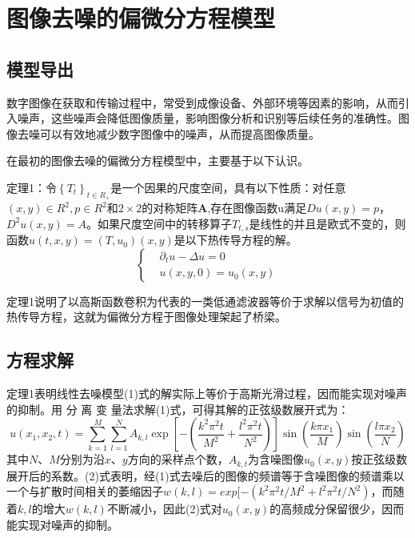 \titleformat{\chapter}[hang]{\linespread{1}\heiti\sanhao\bfseries\filright}{\thechapter}{1em}{}{}
\chapter{图像去噪的偏微分方程模型}
\section{模型导出}
数字图像在获取和传输过程中，常受到成像设备、外部环境等因素的影响，从而引入噪声，这些噪声会降低图像质量，影响图像分析和识别等后续任务的准确性。图像去噪可以有效地减少数字图像中的噪声，从而提高图像质量。

在最初的图像去噪的偏微分方程模型中，主要基于以下认识。

定理1：令$\left\{T_t\right\}_{t\in R_+}$是一个因果的尺度空间，具有以下性质：对任意$(x,y)\in R^2,p \in R^2$和$2\times 2$的对称矩阵\textbf{A},存在图像函数u满足$Du(x,y)=p$，$D^2 u(x,y)=A$。如果尺度空间中的转移算子$T_{t,s}$是线性的并且是欧式不变的，则函数$u(t,x,y)=(T,u_0)(x,y)$是以下热传导方程的解。\cite{aubert2006mathematical}
\begin{equation}
\left\{
\begin{aligned}
& \partial_tu-\Delta u=0 \\
& u(x,y,0)=u_0(x,y)
\end{aligned}
\right.
\tag{1}
\end{equation}

定理1说明了以高斯函数卷积为代表的一类低通滤波器等价于求解以信号为初值的热传导方程，这就为偏微分方程于图像处理架起了桥梁。\cite{JGDJ200508009}

\section{方程求解}
定理1表明线性去噪模型(1)式的解实际上等价于高斯光滑过程，因而能实现对噪声的抑制。用 分 离 变 量法求解(1)式，可得其解的正弦级数展开式为：
\begin{equation}
    u(x_1, x_2, t) = \sum_{k=1}^M \sum_{l=1}^N A_{k,l} \exp\left[-\left(\frac{k^2\pi^2t}{M^2} + \frac{l^2\pi^2t}{N^2}\right)\right] \sin\left(\frac{k\pi x_1}{M}\right) \sin\left(\frac{l\pi x_2}{N}\right)
    \tag{2}
\end{equation}
其中$N$、$M$分别为沿$x$、$y$方向的采样点个数，$A_{k,t}$为含噪图像$u_0(x,y)$按正弦级数展开后的系数。(2)式表明，经(1)式去噪后的图像的频谱等于含噪图像的频谱乘以一个与扩散时间相关的萎缩因子$w(k,l)=exp[-(k^2\pi^2t/M^2+l^2\pi^2t/N^2)$，而随着$k,l$的增大$w(k,l)$不断减小，因此(2)式对$u_0(x,y)$的高频成分保留很少，因而能实现对噪声的抑制。\cite{JGDJ200508009}

